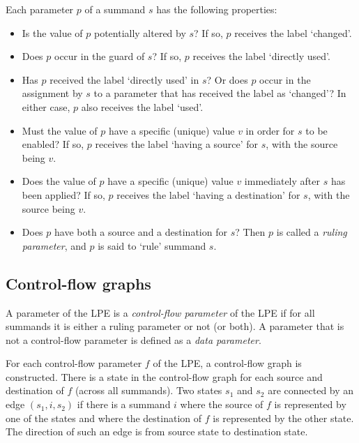 Each parameter $p$ of a summand $s$ has the following properties:
\begin{itemize}

\item Is the value of $p$ potentially altered by $s$?
If so, $p$ receives the label `changed'.

\item Does $p$ occur in the guard of $s$?
If so, $p$ receives the label `directly used'.

\item Has $p$ received the label `directly used' in $s$?
Or does $p$ occur in the assignment by $s$ to a parameter that has received the label as `changed'?
In either case, $p$ also receives the label `used'.

\item Must the value of $p$ have a specific (unique) value $v$ in order for $s$ to be enabled?
If so, $p$ receives the label `having a source' for $s$, with the source being $v$.

\item Does the value of $p$ have a specific (unique) value $v$ immediately after $s$ has been applied?
If so, $p$ receives the label `having a destination' for $s$, with the source being $v$.

\item Does $p$ have both a source and a destination for $s$?
Then $p$ is called a \emph{ruling parameter}, and $p$ is said to `rule' summand $s$.

\end{itemize}

\subsection{Control-flow graphs}

A parameter of the LPE is a \emph{control-flow parameter} of the LPE if for all summands it is either a ruling parameter or not  (or both).
A parameter that is not a control-flow parameter is defined as a \emph{data parameter}.

\vspace{1mm}

For each control-flow parameter $f$ of the LPE, a control-flow graph is constructed.
There is a state in the control-flow graph for each source and destination of $f$ (across all summands).
Two states $s_1$ and $s_2$ are connected by an edge $(s_1, i, s_2)$ if there is a summand $i$ where the source of $f$ is represented by one of the states and where the destination of $f$ is represented by the other state.
The direction of such an edge is from source state to destination state.

